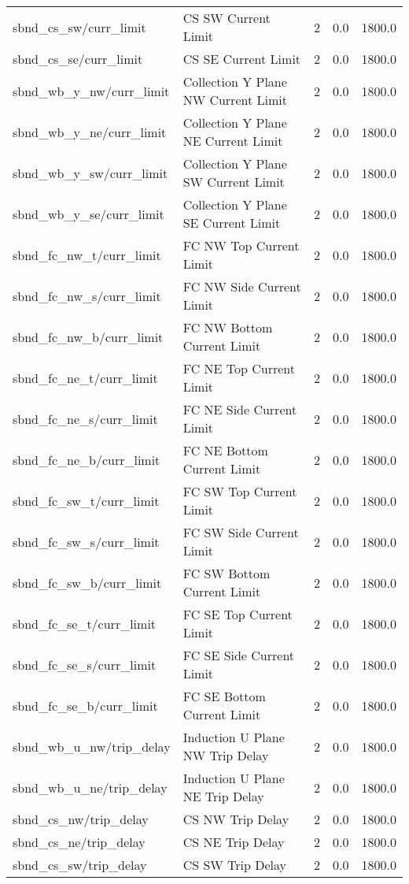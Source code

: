 \begin{center}
\begin{longtable}{l | l l l l }
sbnd\_cs\_sw/curr\_limit & CS SW Current Limit & 2 & 0.0 & 1800.0\\ 
sbnd\_cs\_se/curr\_limit & CS SE Current Limit & 2 & 0.0 & 1800.0\\ 
sbnd\_wb\_y\_nw/curr\_limit & Collection Y Plane NW Current Limit & 2 & 0.0 & 1800.0\\ 
sbnd\_wb\_y\_ne/curr\_limit & Collection Y Plane NE Current Limit & 2 & 0.0 & 1800.0\\ 
sbnd\_wb\_y\_sw/curr\_limit & Collection Y Plane SW Current Limit & 2 & 0.0 & 1800.0\\ 
sbnd\_wb\_y\_se/curr\_limit & Collection Y Plane SE Current Limit & 2 & 0.0 & 1800.0\\ 
sbnd\_fc\_nw\_t/curr\_limit & FC NW Top Current Limit & 2 & 0.0 & 1800.0\\ 
sbnd\_fc\_nw\_s/curr\_limit & FC NW Side Current Limit & 2 & 0.0 & 1800.0\\ 
sbnd\_fc\_nw\_b/curr\_limit & FC NW Bottom Current Limit & 2 & 0.0 & 1800.0\\ 
sbnd\_fc\_ne\_t/curr\_limit & FC NE Top Current Limit & 2 & 0.0 & 1800.0\\ 
sbnd\_fc\_ne\_s/curr\_limit & FC NE Side Current Limit & 2 & 0.0 & 1800.0\\ 
sbnd\_fc\_ne\_b/curr\_limit & FC NE Bottom Current Limit & 2 & 0.0 & 1800.0\\ 
sbnd\_fc\_sw\_t/curr\_limit & FC SW Top Current Limit & 2 & 0.0 & 1800.0\\ 
sbnd\_fc\_sw\_s/curr\_limit & FC SW Side Current Limit & 2 & 0.0 & 1800.0\\ 
sbnd\_fc\_sw\_b/curr\_limit & FC SW Bottom Current Limit & 2 & 0.0 & 1800.0\\ 
sbnd\_fc\_se\_t/curr\_limit & FC SE Top Current Limit & 2 & 0.0 & 1800.0\\ 
sbnd\_fc\_se\_s/curr\_limit & FC SE Side Current Limit & 2 & 0.0 & 1800.0\\ 
sbnd\_fc\_se\_b/curr\_limit & FC SE Bottom Current Limit & 2 & 0.0 & 1800.0\\ 
sbnd\_wb\_u\_nw/trip\_delay & Induction U Plane NW Trip Delay & 2 & 0.0 & 1800.0\\ 
sbnd\_wb\_u\_ne/trip\_delay & Induction U Plane NE Trip Delay & 2 & 0.0 & 1800.0\\ 
sbnd\_cs\_nw/trip\_delay & CS NW Trip Delay & 2 & 0.0 & 1800.0\\ 
sbnd\_cs\_ne/trip\_delay & CS NE Trip Delay & 2 & 0.0 & 1800.0\\ 
sbnd\_cs\_sw/trip\_delay & CS SW Trip Delay & 2 & 0.0 & 1800.0\\ 

\end{longtable}
\end{center}
